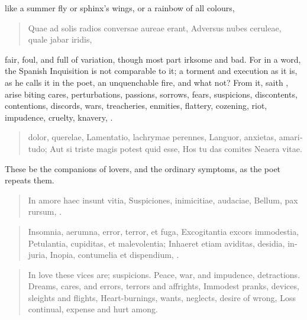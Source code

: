 like a summer fly or sphinx's wings, or a rainbow of all colours,

\begin{latin}
\begin{verse}
Quae ad solis radios conversae aureae erant,
Adversus nubes ceruleae, quale jabar iridis,
\end{verse}
\end{latin}

fair, foul, and full of variation, though most part irksome and bad.
For in a word, the Spanish Inquisition is not comparable to it; a
torment and execution as it is, as he calls it in the poet, an
unquenchable fire, and what not? From it, saith \Austin{}, arise
biting cares, perturbations, passions, sorrows, fears, suspicions,
discontents, contentions, discords, wars, treacheries, enmities,
flattery, cozening, riot, impudence, cruelty, knavery, \etc{}.

\begin{latin}
\begin{verse}
dolor, querelae,
Lamentatio, lachrymae perennes,
Languor, anxietas, amaritudo;
Aut si triste magis potest quid esse,
Hos tu das comites Neaera vitae.
\end{verse}
\end{latin}

These be the companions of lovers, and the ordinary symptoms, as the
poet repeats them.

\begin{latin}
\begin{verse}
In amore haec insunt vitia,
Suspiciones, inimicitiae, audaciae,
Bellum, pax rursum, \etc{}.
\end{verse}
\end{latin}

\begin{latin}
\begin{verse}
Insomnia, aerumna, error, terror, et fuga,
Excogitantia excors immodestia,
Petulantia, cupiditas, et malevolentia;
Inhaeret etiam aviditas, desidia, injuria,
Inopia, contumelia et dispendium, \etc{}.
\end{verse}
\end{latin}
\translationrule%
\begin{verse}%
In love these vices are; suspicions.
Peace, war, and impudence, detractions.
Dreams, cares, and errors, terrors and affrights,
Immodest pranks, devices, sleights and flights,
Heart-burnings, wants, neglects, desire of wrong,
Loss continual, expense and hurt among.
\end{verse}%

